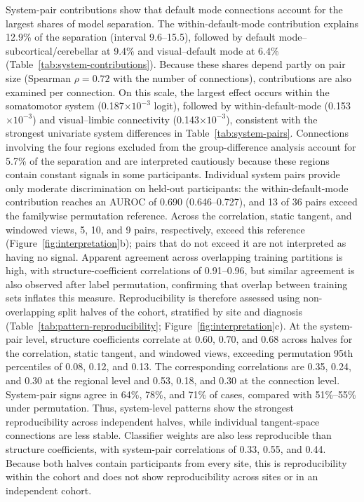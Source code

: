 System-pair contributions show that default mode connections account for the largest shares of model separation. The within-default-mode contribution explains 12.9\% of the separation (interval 9.6--15.5), followed by default mode--subcortical/cerebellar at 9.4\% and visual--default mode at 6.4\% (Table~\ref{tab:system-contributions}). Because these shares depend partly on pair size (Spearman $\rho=0.72$ with the number of connections), contributions are also examined per connection. On this scale, the largest effect occurs within the somatomotor system (0.187$\times10^{-3}$ logit), followed by within-default-mode (0.153$\times10^{-3}$) and visual--limbic connectivity (0.143$\times10^{-3}$), consistent with the strongest univariate system differences in Table~\ref{tab:system-pairs}. Connections involving the four regions excluded from the group-difference analysis account for 5.7\% of the separation and are interpreted cautiously because these regions contain constant signals in some participants. Individual system pairs provide only moderate discrimination on held-out participants: the within-default-mode contribution reaches an AUROC of 0.690 (0.646--0.727), and 13 of 36 pairs exceed the familywise permutation reference. Across the correlation, static tangent, and windowed views, 5, 10, and 9 pairs, respectively, exceed this reference (Figure~\ref{fig:interpretation}b); pairs that do not exceed it are not interpreted as having no signal. Apparent agreement across overlapping training partitions is high, with structure-coefficient correlations of 0.91--0.96, but similar agreement is also observed after label permutation, confirming that overlap between training sets inflates this measure. Reproducibility is therefore assessed using non-overlapping split halves of the cohort, stratified by site and diagnosis (Table~\ref{tab:pattern-reproducibility}; Figure~\ref{fig:interpretation}c). At the system-pair level, structure coefficients correlate at 0.60, 0.70, and 0.68 across halves for the correlation, static tangent, and windowed views, exceeding permutation 95th percentiles of 0.08, 0.12, and 0.13. The corresponding correlations are 0.35, 0.24, and 0.30 at the regional level and 0.53, 0.18, and 0.30 at the connection level. System-pair signs agree in 64\%, 78\%, and 71\% of cases, compared with 51\%--55\% under permutation. Thus, system-level patterns show the strongest reproducibility across independent halves, while individual tangent-space connections are less stable. Classifier weights are also less reproducible than structure coefficients, with system-pair correlations of 0.33, 0.55, and 0.44. Because both halves contain participants from every site, this is reproducibility within the cohort and does not show reproducibility across sites or in an independent cohort.


